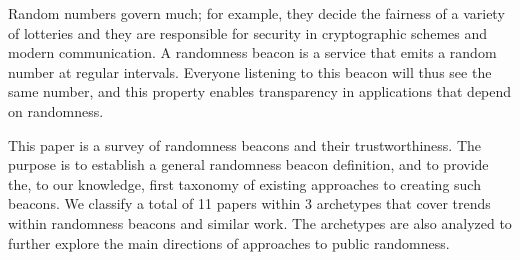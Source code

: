 Random numbers govern much; for example, they decide the fairness of a variety of lotteries and they are responsible for security in cryptographic schemes and modern communication. A randomness beacon is a service that emits a random number at regular intervals. Everyone listening to this beacon will thus see the same number, and this property enables transparency in applications that depend on randomness.%

This paper is a survey of randomness beacons and their trustworthiness. The purpose is to establish a general randomness beacon definition, and to provide the, to our knowledge, first taxonomy of existing approaches to creating such beacons. We classify a total of 11 papers within 3 archetypes that cover trends within randomness beacons and similar work. The archetypes are also analyzed to further explore the main directions of approaches to public randomness.